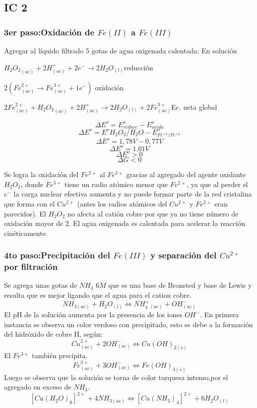 \documentclass[a4paper,12pt]{article}
\begin{document}
\subsection{IC 2}
\subsubsection{3er paso:Oxidación de $Fe(II)$ a $Fe(III)$} Agregar al líquido filtrado 5 gotas de agua oxigenada calentada: En solución 

\hspace{4cm}$H_2{O_2}_{(ac)} + 2H^+ _{(ac)} + 2e^-\to 2H_2O_{(l)}$\hspace{2cm}reducción

\hspace{4cm}$2(Fe^{2+}_{(ac)} \to Fe^{3+}_{(ac)} + 1e^-)$\hspace{2cm} oxidación

\hspace{4cm}$2Fe^{2+}_{(ac)} + H_2{O_2}_{(ac)} + 2H^+ _{(ac)} \to 2H_2O_{(l)} + 2Fe^{3+}_{(ac)}$\hspace{2cm}Ec. neta global
 
 $$\Delta E^o = E^o_{reduce} - E^o_{oxida}$$
 $$\Delta E^o = E^o H_2{O_2}/H_2O - E^o_{Fe^{+3}/Fe^{+2}}$$
 $$\Delta E^o =1,78V - 0,77V$$
 $$\Delta E^o =1.01V$$
 $$\Delta E^o > 0$$
 $$\Delta G<0$$

Se logra la oxidación del $Fe^{2+}$ al $Fe^{3+}$ gracias al agregado del agente oxidante $H_2O_2$, donde $Fe^{3+}$ tiene un radio atómico menor que $Fe^{2+}$, ya que al perder el $e^-$ la carga nuclear efectiva aumenta y no puede formar parte de la red cristalina que forma con el $Cu^{2+}$ (antes los radios atómicos del $Cu^{2+}$ y $Fe^{2+}$ eran parecidos). El $H_2{O_2}$ no afecta al catión cobre por que ya no tiene número de oxidación mayor de 2. El agua oxigenada es calentada para acelerar la reacción cinéticamente.
 
 \subsubsection{4to paso:Precipitación del $Fe(III)$ y separación del $Cu^{2+}$ por filtración} Se agrega unas gotas de $NH_3$ $6M$ que es una base de Bronsted y base de Lewis y resulta que es mejor ligando que el agua para el cation cobre. 
 $$NH_{3(ac)} + H_2O_{(l)}\Leftrightarrow NH_4^+_{(ac)} + OH^-_{(ac)}$$
 El pH de la solución aumenta por la presencia de los iones $OH^-$. En primera instancia se observa un color verdoso con precipitado, esto se debe a la formación del hidróxido de cobre II, según:
 $$Cu^{2+}_{(ac)} + 2OH^-_{(ac)}\Leftrightarrow Cu(OH)_{2(s)}$$
 El $Fe^{3+}$ también precipita.
 $$Fe^{3+}_{(ac)} + 3OH^-_{(ac)}\Leftrightarrow Fe(OH)_{3(s)}$$
 Luego se observa que la solución se torna de color turquesa intenso,por el agregado en exceso de $NH_3$.
  $$[Cu(H_2O)_6]^{2+} + 4NH_{3(ac)}\Leftrightarrow [Cu(NH_3)_4]^{2+} + 6H_2O_{(l)}$$
\end{document}
